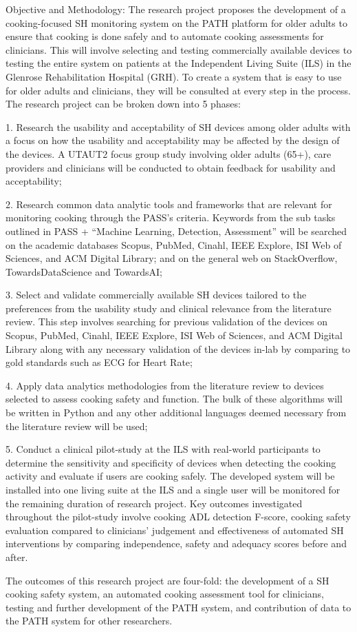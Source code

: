 Objective and Methodology: The research project proposes the development of a cooking-focused SH monitoring system on the PATH platform for older adults to ensure that cooking is done safely and to automate cooking assessments for clinicians. This will involve selecting and testing commercially available devices to testing the entire system on patients at the Independent Living Suite (ILS) in the Glenrose Rehabilitation Hospital (GRH). To create a system that is easy to use for older adults and clinicians, they will be consulted at every step in the process. The research project can be broken down into 5 phases:

1.     Research the usability and acceptability of SH devices among older adults with a focus on how the usability and acceptability may be affected by the design of the devices. A UTAUT2 focus group study involving older adults (65+), care providers and clinicians will be conducted to obtain feedback for usability and acceptability;

2.     Research common data analytic tools and frameworks that are relevant for monitoring cooking through the PASS’s criteria. Keywords from the sub tasks outlined in PASS + “Machine Learning, Detection, Assessment” will be searched on the academic databases Scopus, PubMed, Cinahl, IEEE Explore, ISI Web of Sciences, and ACM Digital Library; and on the general web on StackOverflow, TowardsDataScience and TowardsAI;

3.     Select and validate commercially available SH devices tailored to the preferences from the usability study and clinical relevance from the literature review. This step involves searching for previous validation of the devices on Scopus, PubMed, Cinahl, IEEE Explore, ISI Web of Sciences, and ACM Digital Library along with any necessary validation of the devices in-lab by comparing to gold standards such as ECG for Heart Rate;

4.     Apply data analytics methodologies from the literature review to devices selected to assess cooking safety and function. The bulk of these algorithms will be written in Python and any other additional languages deemed necessary from the literature review will be used;

5.     Conduct a clinical pilot-study at the ILS with real-world participants to determine the sensitivity and specificity of devices when detecting the cooking activity and evaluate if users are cooking safely. The developed system will be installed into one living suite at the ILS and a single user will be monitored for the remaining duration of research project. Key outcomes investigated throughout the pilot-study involve cooking ADL detection F-score, cooking safety evaluation compared to clinicians’ judgement and effectiveness of automated SH interventions by comparing independence, safety and adequacy scores before and after.

 

The outcomes of this research project are four-fold: the development of a SH cooking safety system, an automated cooking assessment tool for clinicians, testing and further development of the PATH system, and contribution of data to the PATH system for other researchers.
